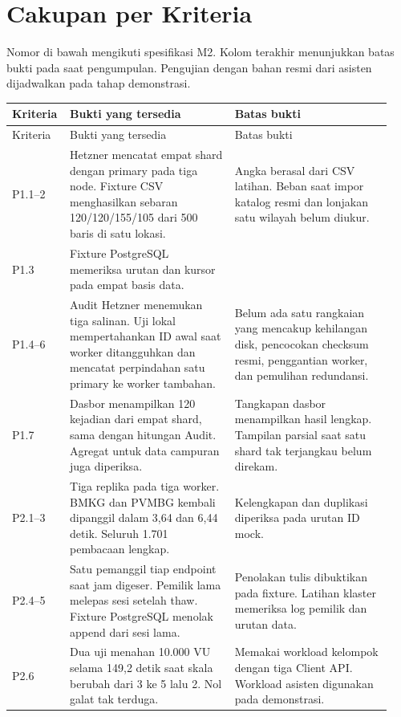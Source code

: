 \section{Cakupan per Kriteria}

Nomor di bawah mengikuti spesifikasi M2. Kolom terakhir menunjukkan batas bukti pada saat pengumpulan. Pengujian dengan bahan resmi dari asisten dijadwalkan pada tahap demonstrasi.

{\small
\begin{longtable}{@{}>{\raggedright\arraybackslash}p{0.115\linewidth}>{\raggedright\arraybackslash}p{0.42\linewidth}>{\raggedright\arraybackslash}p{0.40\linewidth}@{}}
\toprule
Kriteria & Bukti yang tersedia & Batas bukti \\
\midrule
\endfirsthead
\toprule
Kriteria & Bukti yang tersedia & Batas bukti \\
\midrule
\endhead
\bottomrule
\endlastfoot
P1.1--2 & Hetzner mencatat empat shard dengan primary pada tiga node. Fixture CSV menghasilkan sebaran 120/120/155/105 dari 500 baris di satu lokasi. & Angka berasal dari CSV latihan. Beban saat impor katalog resmi dan lonjakan satu wilayah belum diukur. \\
P1.3 & Fixture PostgreSQL memeriksa urutan dan kursor pada empat basis data. & \\
P1.4--6 & Audit Hetzner menemukan tiga salinan. Uji lokal mempertahankan ID awal saat worker ditangguhkan dan mencatat perpindahan satu primary ke worker tambahan. & Belum ada satu rangkaian yang mencakup kehilangan disk, pencocokan checksum resmi, penggantian worker, dan pemulihan redundansi. \\
P1.7 & Dasbor menampilkan 120 kejadian dari empat shard, sama dengan hitungan Audit. Agregat untuk data campuran juga diperiksa. & Tangkapan dasbor menampilkan hasil lengkap. Tampilan parsial saat satu shard tak terjangkau belum direkam. \\
\addlinespace
P2.1--3 & Tiga replika pada tiga worker. BMKG dan PVMBG kembali dipanggil dalam 3{,}64 dan 6{,}44 detik. Seluruh 1.701 pembacaan lengkap. & Kelengkapan dan duplikasi diperiksa pada urutan ID mock. \\
P2.4--5 & Satu pemanggil tiap endpoint saat jam digeser. Pemilik lama melepas sesi setelah thaw. Fixture PostgreSQL menolak append dari sesi lama. & Penolakan tulis dibuktikan pada fixture. Latihan klaster memeriksa log pemilik dan urutan data. \\
P2.6 & Dua uji menahan 10.000 VU selama 149{,}2 detik saat skala berubah dari 3 ke 5 lalu 2. Nol galat tak terduga. & Memakai workload kelompok dengan tiga Client API. Workload asisten digunakan pada demonstrasi. \\

\end{longtable}}
